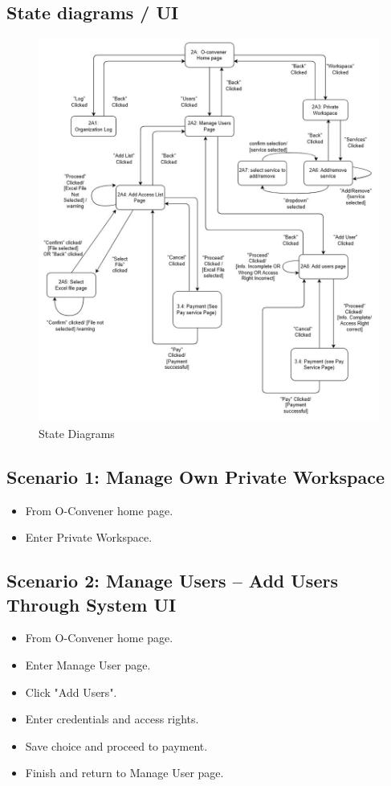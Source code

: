 \subsection{State diagrams / UI}
\begin{figure}[H]
    \centering
    \includegraphics[width=0.75\linewidth]{picture/WechatIMG1905.jpg}
    \caption{State Diagrams}
    \label{fig:enter-label}
\end{figure}

\subsection*{Scenario 1: Manage Own Private Workspace}
\begin{itemize}
    \item From O-Convener home page.
    \item Enter Private Workspace.
\end{itemize}

\subsection*{Scenario 2: Manage Users – Add Users Through System UI}
\begin{itemize}
    \item From O-Convener home page.
    \item Enter Manage User page.
    \item Click "Add Users".
    \item Enter credentials and access rights.
    \item Save choice and proceed to payment.
    \item Finish and return to Manage User page.
\end{itemize}


